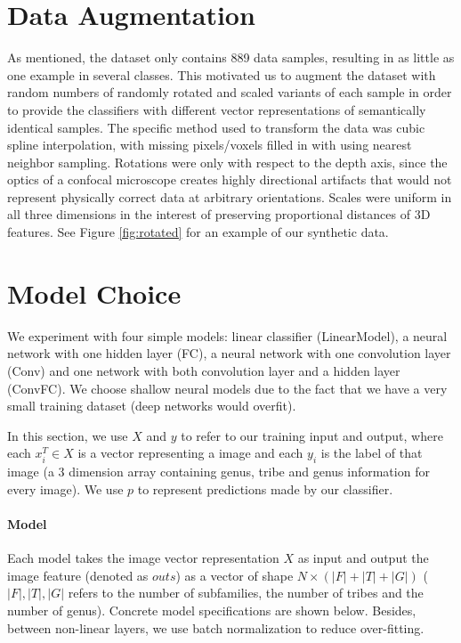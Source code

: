 \documentclass{article}
\begin{document}
\section{Data Augmentation}

As mentioned, the dataset only contains 889 data samples, resulting in as little as one example in several classes. This motivated us to augment the dataset with random numbers of randomly rotated and scaled variants of each sample in order to provide the classifiers with different vector representations of semantically identical samples. The specific method used to transform the data was cubic spline interpolation, with missing pixels/voxels filled in with using nearest neighbor sampling. Rotations were only with respect to the depth axis, since the optics of a confocal microscope creates highly directional artifacts that would not represent physically correct data at arbitrary orientations. Scales were uniform in all three dimensions in the interest of preserving proportional distances of 3D features. See Figure \ref{fig:rotated} for an example of our synthetic data.


\section{Model Choice}

We experiment with four simple models: linear classifier (LinearModel), a neural network with one hidden layer (FC), a neural network with one convolution layer (Conv) and one network with both convolution layer and a hidden layer (ConvFC). We choose shallow neural models due to the fact that we have a very small training dataset (deep networks would overfit).

In this section, we use ${X}$ and ${y}$ to refer to our training input and output, where each ${x}_i^T\in {X}$ is a vector representing a image and each ${y_i}$ is the label of that image (a 3 dimension array containing genus, tribe and genus information for every image). We use ${p}$ to represent predictions made by our classifier. 


\paragraph{Model}

Each model takes the image vector representation $X$ as input and output the image feature (denoted as $\mathit{outs}$) as a vector of shape $N\times (|F| + |T| + |G|)$ ($|F|, |T|, |G|$ refers to the number of subfamilies, the number of tribes and the number of genus). Concrete model specifications are shown below. Besides, between non-linear layers, we use batch normalization to reduce over-fitting.
\end{document}
